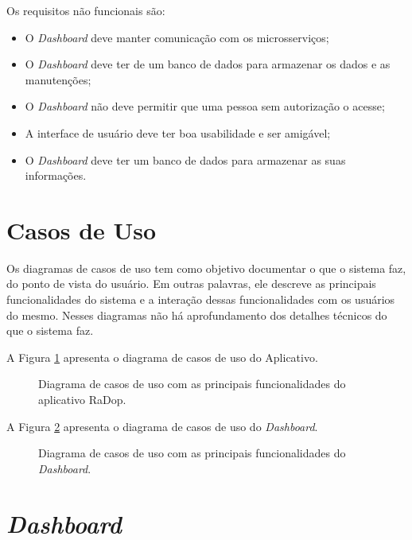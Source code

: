 Os requisitos não funcionais são:

\begin{itemize}
    \item O \textit{Dashboard} deve manter comunicação com os microsserviços;
    \item O \textit{Dashboard} deve ter de um banco de dados para armazenar os dados e as manutenções;
    \item O \textit{Dashboard} não deve permitir que uma pessoa sem autorização o acesse;
    \item A interface de usuário deve ter boa usabilidade e ser amigável;
    \item O \textit{Dashboard} deve ter um banco de dados para armazenar as suas informações.
\end{itemize}

\section{Casos de Uso}

Os diagramas de casos de uso tem como objetivo documentar o que o sistema faz, do ponto de vista do usuário. Em outras palavras, ele descreve as principais funcionalidades do sistema e a interação dessas funcionalidades com os usuários do mesmo. Nesses diagramas não há aprofundamento dos detalhes técnicos do que o sistema faz.

A Figura \ref{fig:casos_de_uso} apresenta o diagrama de casos de uso do Aplicativo.

\begin{figure}[H]
	\caption{\label{fig:casos_de_uso} Diagrama de casos de uso com as principais funcionalidades do aplicativo RaDop.}
\end{figure}

A Figura \ref{fig:diagrama-comm-soft} apresenta o diagrama de casos de uso do \textit{Dashboard}.

\begin{figure}[H]
	\caption{\label{fig:diagrama-comm-soft} Diagrama de casos de uso com as principais funcionalidades do \textit{Dashboard}.}
\end{figure}

\section{\textit{Dashboard}}

